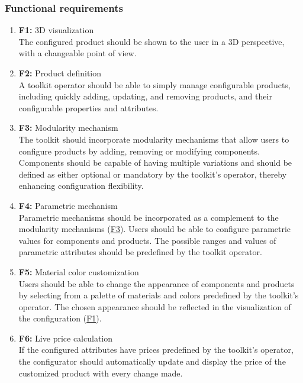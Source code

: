 \subsubsection{Functional requirements}

\begin{enumerate}
\item \textbf{F1:}\label{itm:F1} 3D visualization
\\The configured product should be shown to the user in a 3D perspective, with a changeable point of view. 

\item \textbf{F2:} Product definition
\\A toolkit operator should be able to simply manage configurable products, including quickly adding, updating, and removing products, and their configurable properties and attributes.

\item \textbf{F3:}\label{itm:F3} Modularity mechanism
\\The toolkit should incorporate modularity mechanisms that allow users to configure products by adding, removing or modifying components. Components should be capable of having multiple variations and should be defined as either optional or mandatory by the toolkit's operator, thereby enhancing configuration flexibility.

\item \textbf{F4:} Parametric mechanism
\\Parametric mechanisms should be incorporated as a complement to the modularity mechanisms (\hyperref[itm:F3]{F3}). Users should be able to configure parametric values for components and products. The possible ranges and values of parametric attributes should be predefined by the toolkit operator.

\item \textbf{F5:} Material color customization
\\Users should be able to change the appearance of components and products by selecting from a palette of materials and colors predefined by the toolkit's operator. The chosen appearance should be reflected in the visualization of the configuration (\hyperref[itm:F1]{F1}).

\item \textbf{F6:} Live price calculation
\\If the configured attributes have prices predefined by the toolkit's operator, the configurator should automatically update and display the price of the customized product with every change made.


\end{enumerate}
